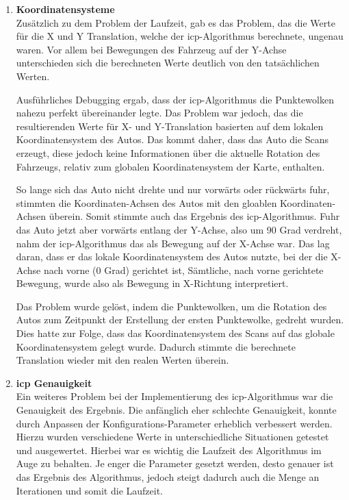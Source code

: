 \begin{enumerate}[leftmargin=*]
    \item \textbf{Koordinatensysteme} \\
    Zusätzlich zu dem Problem der Laufzeit, gab es das Problem, das die Werte für die X und Y Translation, welche der \ac{icp}-Algorithmus berechnete, ungenau waren.
    Vor allem bei Bewegungen des Fahrzeug auf der Y-Achse unterschieden sich die berechneten Werte deutlich von den tatsächlichen Werten.
    
    Ausführliches Debugging ergab, dass der \ac{icp}-Algorithmus die Punktewolken nahezu perfekt übereinander legte.
    Das Problem war jedoch, das die resultierenden Werte für X- und Y-Translation basierten auf dem lokalen Koordinatensystem des Autos.
    Das kommt daher, dass das Auto die Scans erzeugt, diese jedoch keine Informationen über die aktuelle Rotation des Fahrzeugs, 
    relativ zum globalen Koordinatensystem der Karte, enthalten.
    
    So lange sich das Auto nicht drehte und nur vorwärts oder rückwärts fuhr, stimmten die Koordinaten-Achsen des Autos mit den gloablen Koordinaten-Achsen überein.
    Somit stimmte auch das Ergebnis des \ac{icp}-Algorithmus.
    Fuhr das Auto jetzt aber vorwärts entlang der Y-Achse, also um 90 Grad verdreht, nahm der \ac{icp}-Algorithmus das als Bewegung auf der X-Achse war.
    Das lag daran, dass er das lokale Koordinatensystem des Autos nutzte, bei der die X-Achse nach vorne (0 Grad) gerichtet ist,
    Sämtliche, nach vorne gerichtete Bewegung, wurde also als Bewegung in X-Richtung interpretiert.

    Das Problem wurde gelöst, indem die Punktewolken, um die Rotation des Autos zum Zeitpunkt der Erstellung der ersten Punktewolke, gedreht wurden.
    Dies hatte zur Folge, dass das Koordinatensystem des Scans auf das globale Koordinatensystem gelegt wurde.
    Dadurch stimmte die berechnete Translation wieder mit den realen Werten überein.

    \item \textbf{\ac{icp} Genauigkeit} \\
    Ein weiteres Problem bei der Implementierung des \ac{icp}-Algorithmus war die Genauigkeit des Ergebnis.
    Die anfänglich eher schlechte Genauigkeit, konnte durch Anpassen der Konfigurations-Parameter erheblich verbessert werden.
    Hierzu wurden verschiedene Werte in unterschiedliche Situationen getestet und ausgewertet.
    Hierbei war es wichtig die Laufzeit des Algorithmus im Auge zu behalten.
    Je enger die Parameter gesetzt werden, desto genauer ist das Ergebnis des Algorithmus, jedoch steigt dadurch auch die Menge an Iterationen und somit die Laufzeit.


\end{enumerate}
